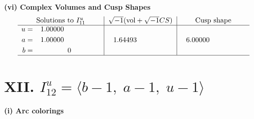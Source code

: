 \documentclass[1p]{elsarticle_modified}
\theoremstyle{definition}
\newcommand{\I}{\sqrt{-1}}
\begin{document}
\newpage\flushleft \textbf{(vi) Complex Volumes and Cusp Shapes}
$$\begin{array}{c|c|c}  
\text{Solutions to }I^u_{11}& \I (\text{vol} + \sqrt{-1}CS) & \text{Cusp shape}\\
 \hline 
\begin{aligned}
u &= \phantom{-}1.00000\phantom{ +0.000000I} \\
a &= \phantom{-}1.00000\phantom{ +0.000000I} \\
b &= \phantom{-0.000000 } 0\end{aligned}
 & \phantom{-}1.64493\phantom{ +0.000000I} & \phantom{-}6.00000\phantom{ +0.000000I}\\
 \hline 
 \end{array}$$\newpage\newpage\renewcommand{\arraystretch}{1}
\centering \section*{XII. $I^u_{12}= \langle b-1,\;a-1,\;u-1 \rangle$}
\flushleft \textbf{(i) Arc colorings}\\
\end{document}
